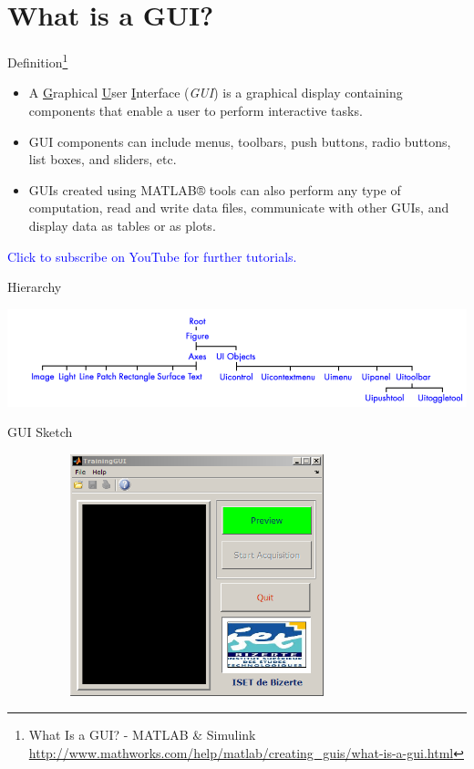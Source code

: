 \documentclass[10pt, english, notes]{beamer}
\begin{document}
\section{What is a GUI?}
\begin{frame}{}
\begin{alertblock}{Definition\footnote{What Is a GUI? - MATLAB \& Simulink \url{http://www.mathworks.com/help/matlab/creating_guis/what-is-a-gui.html}}}
\begin{itemize}
\item A \uline{G}raphical \uline{U}ser \uline{I}nterface (\textit{GUI}) is a graphical display containing components that enable a user to perform interactive tasks.
\item GUI components can include menus, toolbars, push buttons, radio buttons, list boxes, and sliders, etc. 
\item GUIs created using MATLAB® tools can also perform any type of computation, read and write data files, communicate with other GUIs, and display data as tables or as plots.
\end{itemize}
\end{alertblock}
\textcolor{blue}{Click \href{http://www.youtube.com/user/eeprogrammer}{} to subscribe on YouTube for further tutorials.}
\begin{block}{Hierarchy}
\begin{center}
\includegraphics[scale = 0.4, angle = 0]{GUI/Hierarchie}
\end{center}
\end{block}
\end{frame}
\begin{frame}{GUI Sketch}
\begin{center}
\includegraphics[height = 7cm, width = 11cm]{GUI/GUInterface}
\end{center}
\end{frame}
\end{document}
